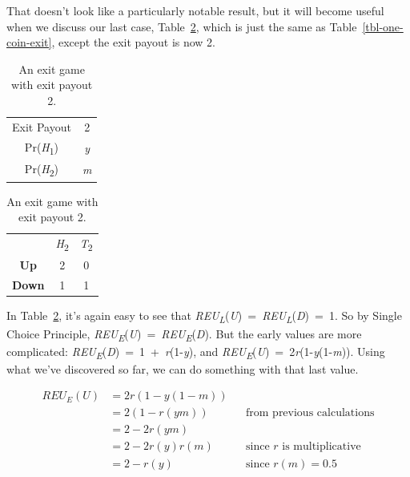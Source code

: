 \documentclass[
  12pt,
  letterpaper,
  DIV=11,
  numbers=noendperiod]{scrreprt}
\begin{document}
That doesn't look like a particularly notable result, but it will become
useful when we discuss our last case, Table~\ref{tbl-two-coin-exit},
which is just the same as Table~\ref{tbl-one-coin-exit}, except the exit
payout is now 2.

\begin{table}

\caption{\label{tbl-two-coin-exit}An exit game with exit payout
2.}\begin{minipage}[t]{0.50\linewidth}

{\centering 

\begin{tabular}[t]{cc}
\toprule
Exit Payout & 2\\
Pr(\emph{H}\textsubscript{1}) & \emph{y}\\
Pr(\emph{H}\textsubscript{2}) & \emph{m}\\
\bottomrule
\end{tabular}

}

\end{minipage}%
%
\begin{minipage}[t]{0.50\linewidth}

{\centering 

\begin{tabular}[t]{ccc}
\toprule
 & \emph{H}\textsubscript{2} & \emph{T}\textsubscript{2}\\
\textbf{Up} & 2 & 0\\
\textbf{Down} & 1 & 1\\
\bottomrule
\end{tabular}

}

\end{minipage}%

\end{table}

In Table~\ref{tbl-two-coin-exit}, it's again easy to see that
\emph{REU\textsubscript{L}}(\emph{U})~=~\emph{REU\textsubscript{L}}(\emph{D})~=~1.
So by Single Choice Principle,
\emph{REU\textsubscript{E}}(\emph{U})~=~\emph{REU\textsubscript{E}}(\emph{D}).
But the early values are more complicated:
\emph{REU\textsubscript{E}}(\emph{D})~=~1~+~\emph{r}(1-\emph{y}), and
\emph{REU\textsubscript{E}}(\emph{U})~=~2\emph{r}(1-\emph{y}(1-\emph{m})).
Using what we've discovered so far, we can do something with that last
value.

\begin{align*}
REU_E(U) &= 2r(1-y(1-m)) \\
  &= 2(1-r(ym))  && \text{from previous calculations} \\
  &= 2 - 2r(ym) \\
  &= 2 - 2r(y)r(m) && \text{since $r$ is multiplicative} \\
  &= 2 - r(y)  && \text{since $r(m) = 0.5$}
\end{align*}
\end{document}
